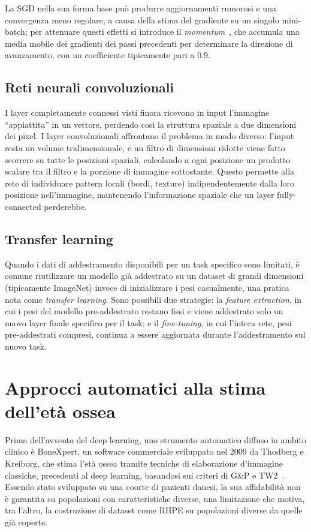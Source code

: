 La SGD nella sua forma base può produrre aggiornamenti rumorosi e una
convergenza meno regolare, a causa della stima del gradiente su un
singolo mini-batch; per attenuare questi effetti si introduce il
\emph{momentum}~\cite{sutskever2013momentum},
che accumula una media mobile dei gradienti dei passi precedenti per
determinare la direzione di avanzamento, con un coefficiente tipicamente
pari a 0.9.

\subsection{Reti neurali convoluzionali}

I layer completamente connessi visti finora ricevono in input
l'immagine ``appiattita'' in un vettore, perdendo così la struttura
spaziale a due dimensioni dei pixel. I layer convoluzionali affrontano
il problema in modo diverso: l'input resta un volume tridimensionale, e
un filtro di dimensioni ridotte viene fatto scorrere su tutte le
posizioni spaziali, calcolando a ogni posizione un prodotto scalare tra
il filtro e la porzione di immagine sottostante. Questo permette alla
rete di individuare pattern locali (bordi, texture) indipendentemente
dalla loro posizione nell'immagine, mantenendo l'informazione spaziale
che un layer fully-connected perderebbe.

\subsection{Transfer learning}
\label{sec:transfer_learning}

Quando i dati di addestramento disponibili per un task specifico sono
limitati, è comune riutilizzare un modello già addestrato su un dataset
di grandi dimensioni (tipicamente ImageNet) invece di inizializzare i
pesi casualmente, una pratica nota come \emph{transfer learning}. Sono
possibili due strategie: la \emph{feature extraction}, in cui i pesi del
modello pre-addestrato restano fissi e viene addestrato solo un nuovo
layer finale specifico per il task; e il \emph{fine-tuning}, in cui
l'intera rete, pesi pre-addestrati compresi, continua a essere
aggiornata durante l'addestramento sul nuovo task.

\section{Approcci automatici alla stima dell'età ossea}
\label{sec:approcci_automatici}

Prima dell'avvento del deep learning, uno strumento automatico diffuso
in ambito clinico è BoneXpert, un software commerciale sviluppato nel
2009 da Thodberg e Kreiborg, che stima l'età ossea tramite
tecniche di elaborazione d'immagine classiche, precedenti al deep
learning, basandosi sui criteri di G\&P e TW2~\cite{escobar2019bonet}.
Essendo stato sviluppato
su una coorte di pazienti danesi, la sua affidabilità non è garantita
su popolazioni con caratteristiche diverse, una limitazione che motiva,
tra l'altro, la costruzione di dataset come RHPE su popolazioni diverse
da quelle già coperte.

